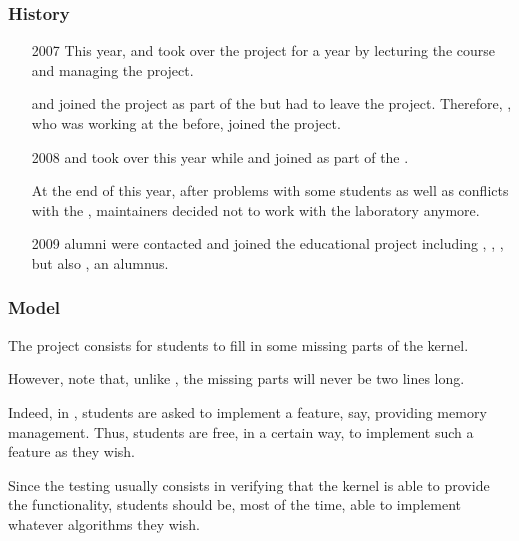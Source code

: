 \begin{frame}
  \frametitle{History}

  \begin{itemize}
    \item[2007]
      This year,  and  took
      over the project for a year by lecturing the course and managing the
      project.

      \-

       and  joined the project
      as part of the  but  had to leave the
      project. Therefore, , who was working at the
       before, joined the project.
    \item[2008]
       and  took over this year
      while  and  joined as part
      of the .

      \-

      At the end of this year, after problems with some students as well as
      conflicts with the ,  maintainers decided not
      to work with the laboratory anymore.
    \item[2009]
       alumni were contacted and joined the educational project
      including , ,
      ,  but also
      , an  alumnus.
  \end{itemize}
\end{frame}


\begin{frame}
  \frametitle{Model}

  The project consists for students to fill in some missing parts of the
  kernel.

  \-

  However, note that, unlike , the missing parts will never
  be two lines long.

  \-

  Indeed, in , students are asked to implement a feature, say,
  providing memory management. Thus, students are free, in a certain way,
  to implement such a feature as they wish.

  \-

  Since the testing usually consists in verifying that the kernel is able
  to provide the functionality, students should be, most of the time, able
  to implement whatever algorithms \etc{} they wish.
\end{frame}

